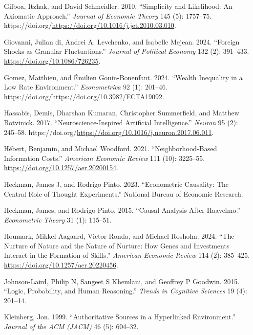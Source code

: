 \documentclass[
]{article}
\newlength{\cslhangindent}
\newenvironment{CSLReferences}[2] %
 {\begin{list}{}{%
  \setlength{\itemindent}{0pt}
  \setlength{\leftmargin}{0pt}
  \setlength{\parsep}{0pt}
  \ifodd #1
   \setlength{\leftmargin}{\cslhangindent}
   \setlength{\itemindent}{-1\cslhangindent}
  \fi
  \setlength{\itemsep}{#2\baselineskip}}}
 {\end{list}}
\begin{document}
\begin{CSLReferences}{1}{0}
Gilboa, Itzhak, and David Schmeidler. 2010. {``Simplicity and
Likelihood: An Axiomatic Approach.''} \emph{Journal of Economic Theory}
145 (5): 1757--75.
https://doi.org/\url{https://doi.org/10.1016/j.jet.2010.03.010}.

Giovanni, Julian di, Andrei A. Levchenko, and Isabelle Mejean. 2024.
{``Foreign Shocks as Granular Fluctuations.''} \emph{Journal of
Political Economy} 132 (2): 391--433.
\url{https://doi.org/10.1086/726235}.

Gomez, Matthieu, and Émilien Gouin-Bonenfant. 2024. {``Wealth Inequality
in a Low Rate Environment.''} \emph{Econometrica} 92 (1): 201--46.
https://doi.org/\url{https://doi.org/10.3982/ECTA19092}.

Hassabis, Demis, Dharshan Kumaran, Christopher Summerfield, and Matthew
Botvinick. 2017. {``Neuroscience-Inspired Artificial Intelligence.''}
\emph{Neuron} 95 (2): 245--58.
https://doi.org/\url{https://doi.org/10.1016/j.neuron.2017.06.011}.

Hébert, Benjamin, and Michael Woodford. 2021. {``Neighborhood-Based
Information Costs.''} \emph{American Economic Review} 111 (10):
3225--55. \url{https://doi.org/10.1257/aer.20200154}.

Heckman, James J, and Rodrigo Pinto. 2023. {``Econometric Causality: The
Central Role of Thought Experiments.''} National Bureau of Economic
Research.

Heckman, James, and Rodrigo Pinto. 2015. {``Causal Analysis After
Haavelmo.''} \emph{Econometric Theory} 31 (1): 115--51.

Houmark, Mikkel Aagaard, Victor Ronda, and Michael Rosholm. 2024. {``The
Nurture of Nature and the Nature of Nurture: How Genes and Investments
Interact in the Formation of Skills.''} \emph{American Economic Review}
114 (2): 385--425. \url{https://doi.org/10.1257/aer.20220456}.

Johnson-Laird, Philip N, Sangeet S Khemlani, and Geoffrey P Goodwin.
2015. {``Logic, Probability, and Human Reasoning.''} \emph{Trends in
Cognitive Sciences} 19 (4): 201--14.

Kleinberg, Jon. 1999. {``Authoritative Sources in a Hyperlinked
Environment.''} \emph{Journal of the ACM (JACM)} 46 (5): 604--32.


\end{CSLReferences}
\end{document}
